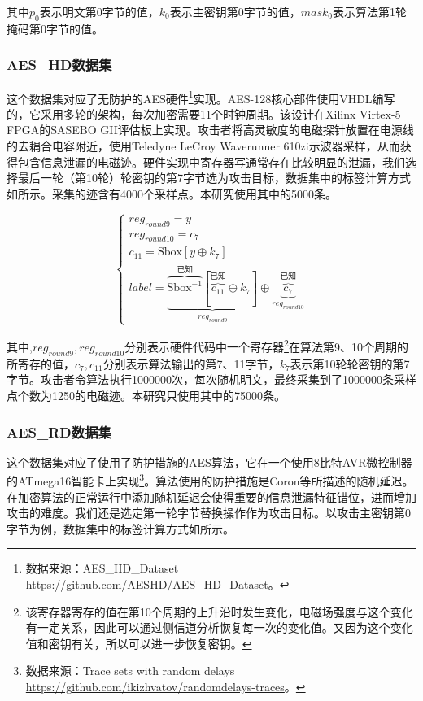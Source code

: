 {	\noindent 其中$p_0$表示明文第0字节的值，$k_0$表示主密钥第0字节的值，$mask_0$表示算法第1轮掩码第0字节的值。
	
	\subsubsection{AES\_HD数据集}
	这个数据集对应了无防护的AES硬件\footnote{数据来源：AES\_HD\_Dataset \href{https://github.com/AESHD/AES\_HD\_Dataset}{https://github.com/AESHD/AES\_HD\_Dataset}。}实现。AES-128核心部件使用VHDL编写的，它采用多轮的架构，每次加密需要11个时钟周期。该设计在Xilinx Virtex-5 FPGA的SASEBO GII评估板上实现。攻击者将高灵敏度的电磁探针放置在电源线的去耦合电容附近，使用Teledyne LeCroy Waverunner 610zi示波器采样，从而获得包含信息泄漏的电磁迹。硬件实现中寄存器写通常存在比较明显的泄漏，我们选择最后一轮（第10轮）轮密钥的第7字节选为攻击目标，数据集中的标签计算方式如所示。采集的迹含有4000个采样点。本研究使用其中的5000条。
	
	\begin{equation}
		\begin{cases}
			reg_{round9}=y\\
			reg_{round10}=c_{7}\\
			c_{11}=\mathrm{Sbox}[y\oplus k_7]\\
			label =\underbrace{\overbrace{\mathrm{Sbox}^{-1}}^{\mbox{已知}}[\overbrace{c_{11}}^{\mbox{已知}}\oplus k_{7}]}_{reg_{round9}}\oplus \underbrace{\overbrace{c_{7}}^{\mbox{已知}}}_{reg_{round10}}
		\end{cases}\label{eq:aeshdmodel}
	\end{equation}
	
	\noindent 其中,$reg_{round9},reg_{round10}$分别表示硬件代码中一个寄存器\footnote{该寄存器寄存的值在第10个周期的上升沿时发生变化，电磁场强度与这个变化有一定关系，因此可以通过侧信道分析恢复每一次的变化值。又因为这个变化值和密钥有关，所以可以进一步恢复密钥。}在算法第9、10个周期的所寄存的值，$c_7,c_{11}$分别表示算法输出的第7、11字节，$k_7$表示第10轮轮密钥的第7字节。攻击者令算法执行1000000次，每次随机明文，最终采集到了1000000条采样点个数为1250的电磁迹。本研究只使用其中的75000条。
	
	\subsubsection{AES\_RD数据集}
	这个数据集对应了使用了防护措施的AES算法，它在一个使用8比特AVR微控制器的ATmega16智能卡上实现\footnote{数据来源：Trace sets with random delays \href{https://github.com/ikizhvatov/randomdelays-traces}{https://github.com/ikizhvatov/randomdelays-traces}。}。算法使用的防护措施是Coron等\citep{Coron09}所描述的随机延迟。在加密算法的正常运行中添加随机延迟会使得重要的信息泄漏特征错位，进而增加攻击的难度。我们还是选定第一轮字节替换操作作为攻击目标。以攻击主密钥第0字节为例，数据集中的标签计算方式如所示。
	
}
